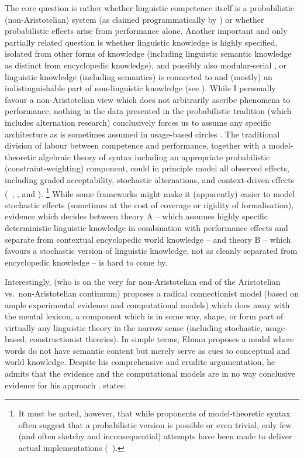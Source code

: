 The core question is rather whether linguistic competence itself is a probabilistic (non-Aristotelian) system (as claimed programmatically by \citealt{Bresnan2007}) or whether probabilistic effects arise from performance alone.%
Another important and only partially related question is whether linguistic knowledge is highly specified, isolated from other forms of knowledge (including linguistic semantic knowledge as distinct from encyclopedic knowledge), and possibly also modular-serial \citep{Fodor1995}, or linguistic knowledge (including semantics) is connected to and (mostly) an indistinguishable part of non-linguistic knowledge (see \citealt{Elman2009}).
While I personally favour a non-Aristotelian view which does not arbitrarily ascribe phenomena to performance, nothing in the data presented in the probabilistic tradition (which includes alternation research) conclusively forces us to assume any specific architecture as is sometimes assumed in usage-based circles \cite{BybeeBeckner2009}.
The traditional division of labour between competence and performance, together with a model-theoretic algebraic theory of syntax including an appropriate probabilistic (constraint-weighting) component, could in principle model all observed effects, including graded acceptability, stochastic alternations, and context-driven effects (\eeg\ \citealt[504--507]{Pullum2013}, \citealt{Pullum2013a}, and \citealt[499--500,507--518]{Mueller2018}).%
\footnote{It must be noted, however, that while proponents of model-theoretic syntax often suggest that a probabilistic version is possible \citep[500]{Mueller2018} or even trivial, only few (and often sketchy and inconsequential) attempts have been made to deliver actual implementations (\eeg\ \citealt{ArnoldLindarki2007}).}
While some frameworks might make it (apparently) easier to model stochastic effects (sometimes at the cost of coverage or rigidity of formalisation), evidence which decides between theory A -- which assumes highly specific deterministic linguistic knowledge in combination with performance effects and separate from contextual encyclopedic world knowledge -- and theory B -- which favours a stochastic version of linguistic knowledge, not as cleanly separated from encyclopedic knowledge -- is hard to come by.

Interestingly, \citet{Elman2009} (who is on the very far non-Aristotelian end of the Aristotelian vs.\ non-Aristotelian continuum) proposes a radical connectionist model (based on ample experimental evidence and computational models) which does away with the mental lexicon, a component which is in some way, shape, or form part of virtually any linguistic theory in the narrow sense (including stochastic, usage-based, constructionist theories).
In simple terms, Elman proposes a model where words do not have semantic content but merely serve as cues to conceptual and world knowledge.
Despite his comprehensive and erudite argumentation, he admits that the evidence and the computational models are in no way conclusive evidence for his approach \citep[573--574]{Elman2009}.
\citet[573]{Elman2009} states:

